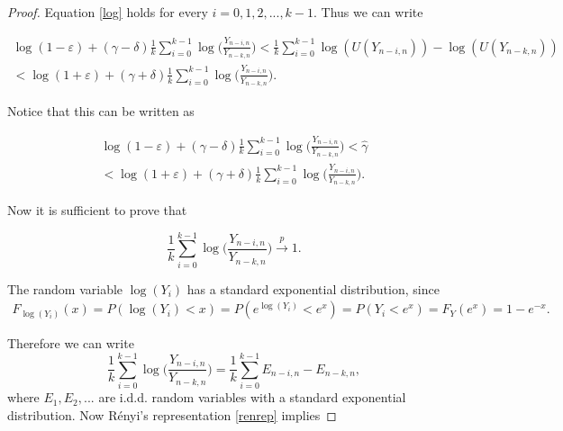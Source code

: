 \documentclass[english,12pt,a4paper,pdftex,sci,utf8]{aaltothesis} %
\begin{document}
\begin{proof}
Equation \eqref{log} holds for every $i = 0,1,2,..., k-1$. Thus we can write

\begin{equation*}
\begin{split}
\log(1 - \varepsilon) + (\gamma - \delta) \frac{1}{k} \sum_{i=0}^{k-1} \log\Big(\frac{Y_{n-i,n}}{Y_{n-k,n}}\Big) < \frac{1}{k} \sum_{i=0}^{k-1} \log(U(Y_{n-i,n})) - \log(U(Y_{n-k,n})) \\
< \log(1 + \varepsilon) + (\gamma + \delta) \frac{1}{k} \sum_{i=0}^{k-1} \log\Big(\frac{Y_{n-i,n}}{Y_{n-k,n}}\Big).
\end{split}
\end{equation*}

Notice that this can be written as

\begin{equation*}
\begin{split}
\log(1 - \varepsilon) + (\gamma - \delta) \frac{1}{k} \sum_{i=0}^{k-1} \log\Big(\frac{Y_{n-i,n}}{Y_{n-k,n}}\Big) < \hat{\gamma} \\
< \log(1 + \varepsilon) + (\gamma + \delta) \frac{1}{k} \sum_{i=0}^{k-1} \log\Big(\frac{Y_{n-i,n}}{Y_{n-k,n}}\Big).
\end{split}
\end{equation*}

Now it is sufficient to prove that 

\begin{equation*}
\frac{1}{k} \sum_{i=0}^{k-1} \log\Big(\frac{Y_{n-i,n}}{Y_{n-k,n}}\Big) \xrightarrow{p} 1.
\end{equation*}

The random variable $\log(Y_i)$ has a standard exponential distribution, since 
\begin{equation*}
\begin{split}
F_{\log(Y_i)}(x) = P(\log(Y_i) < x) = P(e^{\log(Y_i)} < e^x) = P(Y_i < e^x) = F_Y(e^x) = 1 - {e^{-x}}.
\end{split}
\end{equation*}

Therefore we can write
\begin{equation*}
\frac{1}{k} \sum_{i=0}^{k-1} \log\Big(\frac{Y_{n-i,n}}{Y_{n-k,n}}\Big) = \frac{1}{k} \sum_{i=0}^{k-1} E_{n-i,n} - E_{n-k,n},
\end{equation*}
where $E_1, E_2,...$ are i.d.d. random variables with a standard exponential distribution. Now R{\'e}nyi's representation \ref{renrep} implies


\end{proof}
\end{document}
